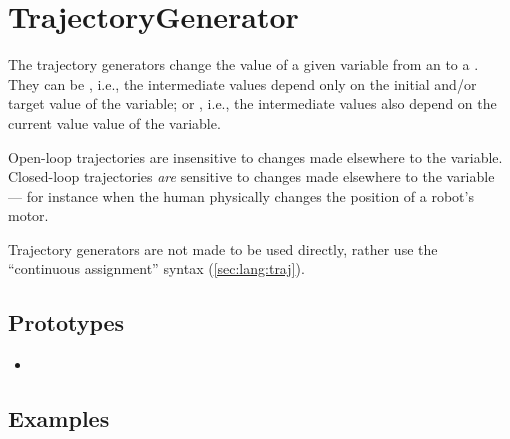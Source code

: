 
\section{TrajectoryGenerator}

The trajectory generators change the value of a given variable from an
 to a .  They can be
, i.e., the intermediate values depend only on the
initial and/or target value of the variable; or ,
i.e., the intermediate values also depend on the current value value
of the variable.

Open-loop trajectories are insensitive to changes made elsewhere to
the variable.  Closed-loop trajectories \emph{are} sensitive to
changes made elsewhere to the variable --- for instance when the human
physically changes the position of a robot's motor.

Trajectory generators are not made to be used directly, rather use the
``continuous assignment'' syntax (\autoref{sec:lang:traj}).


\subsection{Prototypes}
\begin{itemize}
\item {}
\end{itemize}

\subsection{Examples}
\label{sec:traj:examples}

\let\subsubsectionOrig\subsubsection
\renewcommand{\subsubsection}[1]
{%
  \subsubsectionOrig{\label{sec:traj:#1}#1}%
  \index{#1@\lstinline[]{#1}}%
}

